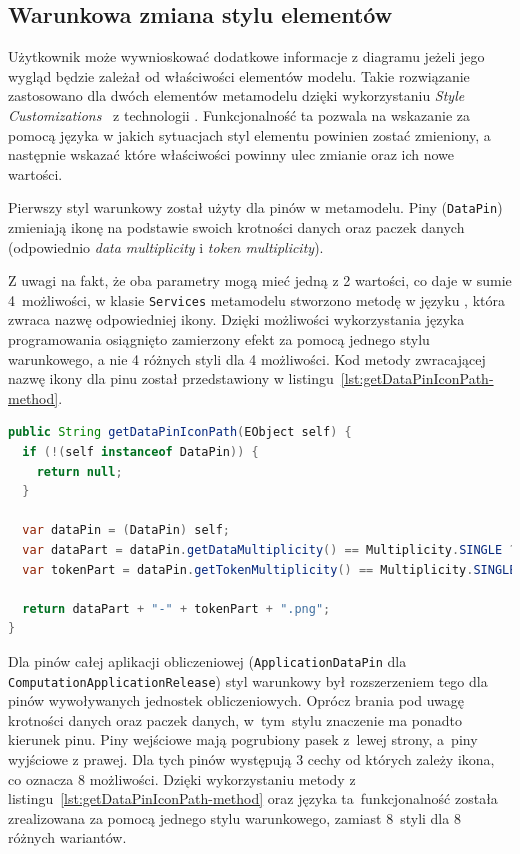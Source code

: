 \subsection{Warunkowa zmiana stylu elementów}

Użytkownik może wywnioskować dodatkowe informacje z diagramu jeżeli jego wygląd
będzie zależał od właściwości elementów modelu. Takie rozwiązanie zastosowano
dla dwóch elementów metamodelu dzięki wykorzystaniu \emph{Style
	Customizations}~\cite{sirius-desktop-documentation-style-customizations}
z technologii \EMF{}.
Funkcjonalność ta pozwala na wskazanie za pomocą języka \AQL{} w jakich
sytuacjach styl elementu powinien zostać zmieniony, a następnie wskazać które
właściwości powinny ulec zmianie oraz ich nowe wartości.

Pierwszy styl warunkowy został użyty dla pinów w metamodelu. Piny
(\texttt{DataPin}) zmieniają ikonę na podstawie swoich krotności danych oraz
paczek danych (odpowiednio \emph{data multiplicity} i \emph{token
	multiplicity}).

Z uwagi na fakt, że oba parametry mogą mieć jedną z 2 wartości,
co daje w sumie 4~możliwości, w klasie \texttt{Services} metamodelu stworzono
metodę w języku \Java{}, która zwraca nazwę odpowiedniej ikony.
Dzięki możliwości wykorzystania języka programowania osiągnięto
zamierzony efekt za pomocą jednego stylu warunkowego, a nie 4 różnych
styli dla 4 możliwości. Kod metody zwracającej nazwę ikony dla pinu
został przedstawiony w listingu~\ref{lst:getDataPinIconPath-method}.

\begin{lstlisting}[float,
    floatplacement=ht,
    language=Java,
    caption={Metoda zwracająca nazwę ikony dla pinu},
    label={lst:getDataPinIconPath-method}]
public String getDataPinIconPath(EObject self) {
  if (!(self instanceof DataPin)) {
    return null;
  }

  var dataPin = (DataPin) self;
  var dataPart = dataPin.getDataMultiplicity() == Multiplicity.SINGLE ? "single-data" : "multiple-data";
  var tokenPart = dataPin.getTokenMultiplicity() == Multiplicity.SINGLE ? "single-token" : "multiple-tokens";

  return dataPart + "-" + tokenPart + ".png";
}
\end{lstlisting}

Dla pinów całej aplikacji obliczeniowej (\texttt{Application\-Data\-Pin} dla
\texttt{Computation\-Application\-Release}) styl warunkowy był
rozszerzeniem tego
dla pinów wywoływanych jednostek obliczeniowych. Oprócz brania pod uwagę
krotności danych
oraz
paczek danych, w~tym~stylu znaczenie ma ponadto kierunek pinu. Piny wejściowe
mają pogrubiony pasek z~lewej strony, a~piny wyjściowe z prawej. Dla tych
pinów występują 3 cechy od których zależy ikona, co oznacza 8 możliwości.
Dzięki wykorzystaniu metody z listingu~\ref{lst:getDataPinIconPath-method} oraz
języka \AQL{} ta~funkcjonalność została zrealizowana za pomocą jednego stylu
warunkowego, zamiast 8~styli dla 8 różnych wariantów.

